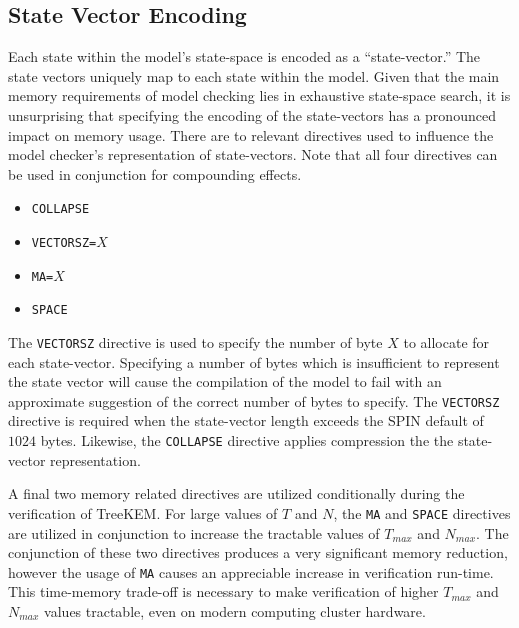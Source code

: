 \hypertarget{state-vector-encoding}{%
\subsection{State Vector Encoding}\label{state-vector-encoding}}

Each state within the model's state-space is encoded as a ``state-vector.''
The state vectors uniquely map to each state within the model.
Given that the main memory requirements of model checking lies in exhaustive state-space search, it is unsurprising that specifying the encoding of the state-vectors has a pronounced impact on memory usage.
There are to relevant directives used to influence the model checker's representation of state-vectors.
Note that all four directives can be used in conjunction for compounding effects.

\begin{itemize}
\item
  \texttt{COLLAPSE}
\item
  \texttt{VECTORSZ=}\(X\)
\item
  \texttt{MA=}\(X\)
\item
  \texttt{SPACE}
\end{itemize}

The \texttt{VECTORSZ} directive is used to specify the number of byte \(X\) to allocate for each state-vector.
Specifying a number of bytes which is insufficient to represent the state vector will cause the compilation of the model to fail with an approximate suggestion of the correct number of bytes to specify.
The \texttt{VECTORSZ} directive is required when the state-vector length exceeds the SPIN default of \(1024\) bytes.
Likewise, the \texttt{COLLAPSE} directive applies compression the the state-vector representation.

A final two memory related directives are utilized conditionally during the verification of TreeKEM.
For large values of \(T\) and \(N\), the \texttt{MA} and \texttt{SPACE} directives are utilized in conjunction to increase the tractable values of \(T_{max}\) and \(N_{max}\).
The conjunction of these two directives produces a very significant memory reduction, however the usage of \texttt{MA} causes an appreciable increase in verification run-time.
This time-memory trade-off is necessary to make verification of higher \(T_{max}\) and \(N_{max}\) values tractable, even on modern computing cluster hardware.

